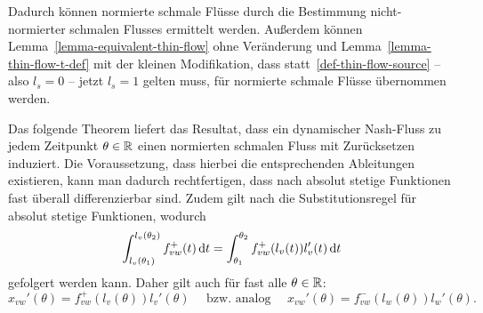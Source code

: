 Dadurch können normierte schmale Flüsse durch die Bestimmung nicht-normier\-ter schmalen Flusses ermittelt werden.
Außerdem können Lemma~\ref{lemma-equivalent-thin-flow} ohne Verän\-derung und Lemma~\ref{lemma-thin-flow-t-def} mit der kleinen Modifikation, dass statt~\ref{def-thin-flow-source} -- also $l_s = 0$ -- jetzt $l_s = 1$ gelten muss, für normierte schmale Flüsse übernommen werden.

Das folgende Theorem liefert das Resultat, dass ein dynamischer Nash-Fluss zu jedem Zeitpunkt $\theta\in\mathbb{R}$ einen normierten schmalen Fluss mit Zurücksetzen induziert.
Die Voraussetzung, dass hierbei die entsprechenden Ableitungen existieren, kann man dadurch rechtfertigen, dass nach \cite[Folgerung~4.12~b)]{Elstrodt2011Abs} absolut stetige Funktionen fast überall differenzierbar sind.
Zudem gilt nach \cite[Aufgabe~4.10]{Elstrodt2011Abs} die Substitutionsregel für absolut stetige Funktionen, wodurch
\[ 
\int_{l_v(\theta_1)}^{l_v(\theta_2)} f_{vw}^+(t) \mathop{}\!\mathrm{d} t = \int_{\theta_1}^{\theta_2} f_{vw}^+(l_v(t)) l_v'(t) \mathop{}\!\mathrm{d} t
\]
gefolgert werden kann.
Daher gilt auch für fast alle $\theta\in\mathbb{R}$:
\[ 
x_{vw}'(\theta) = f_{vw}^+(l_v(\theta))l_v'(\theta) \text{~~~ bzw. analog ~~~} x_{vw}'(\theta) = f_{vw}^-(l_w(\theta)) l_w'(\theta).
\]

